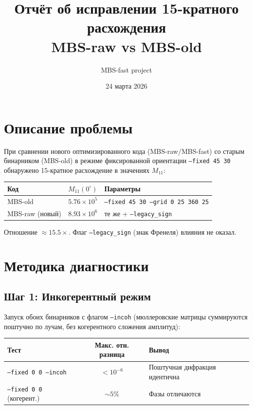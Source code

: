 \documentclass[a4paper,11pt]{article}
\title{Отчёт об исправлении 15-кратного расхождения \\ MBS-raw vs MBS-old}
\author{MBS-fast project}
\date{24 марта 2026}
\begin{document}
\maketitle

\section{Описание проблемы}

При сравнении нового оптимизированного кода (MBS-raw/MBS-fast) со старым бинарником
(MBS-old) в режиме фиксированной ориентации \texttt{--fixed 45 30} обнаружено
15-кратное расхождение в значениях $M_{11}$:

\begin{center}
\begin{tabular}{lrl}
\toprule
Код & $M_{11}(0^\circ)$ & Параметры \\
\midrule
MBS-old & $5.76 \times 10^5$ & \texttt{--fixed 45 30 --grid 0 25 360 25} \\
MBS-raw (новый) & $8.93 \times 10^6$ & те же + \texttt{--legacy\_sign} \\
\bottomrule
\end{tabular}
\end{center}

Отношение $\approx 15.5\times$. Флаг \texttt{--legacy\_sign} (знак Френеля) влияния
не оказал.

\section{Методика диагностики}

\subsection{Шаг 1: Инкогерентный режим}

Запуск обоих бинарников с флагом \texttt{--incoh} (мюллеровские матрицы суммируются
поштучно по лучам, без когерентного сложения амплитуд):

\begin{center}
\begin{tabular}{lcl}
\toprule
Тест & Макс. отн. разница & Вывод \\
\midrule
\texttt{--fixed 0 0 --incoh} & $< 10^{-6}$ & Поштучная дифракция идентична \\
\texttt{--fixed 0 0} (когерент.) & $\sim 5\%$ & Фазы отличаются \\
\bottomrule
\end{tabular}
\end{center}
\end{document}

